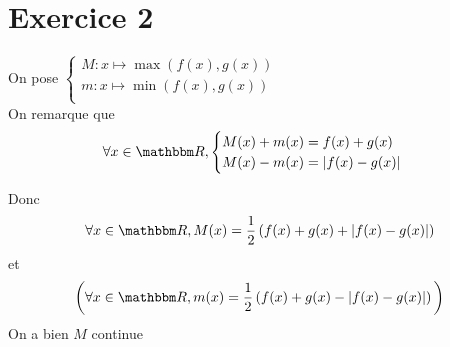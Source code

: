 \part{Exercice 2}

On pose $\begin{cases}
	M: x \mapsto \max(f(x),g(x))\\
	m: x \mapsto \min(f(x),g(x))\\
\end{cases}$ \\
On remarque que \[
	\forall x \in \R,
	\begin{cases}
		M(x) + m(x) = f(x) + g(x)\\
		M(x) - m(x) = \left| f(x) - g(x) \right| 
	\end{cases}
\]

Donc \[
	\forall x \in \R, M(x) = \frac{1}{2}\left( f(x) + g(x) + \left| f(x) - g(x) \right| \right)
\] et \[
	\bigg(
	\forall x \in \R, m(x) = \frac{1}{2}\left( f(x) + g(x) - \left| f(x) - g(x) \right| \right)
	\bigg)
\]
On a bien $M$ continue
